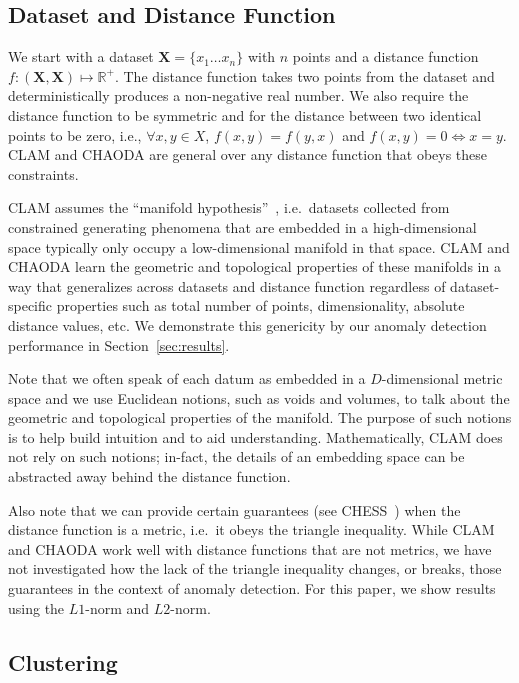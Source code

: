 \subsection{Dataset and Distance Function}
\label{subsec:methods:dataset-and-distance-function}

We start with a dataset $\textbf{X} = \{x_1 \dots x_n\}$ with $n$ points and a distance function $f : (\textbf{X}, \textbf{X}) \mapsto \mathbb{R}^+$.
The distance function takes two points from the dataset and deterministically produces a non-negative real number.
We also require the distance function to be symmetric and for the distance between two identical points to be zero, i.e., $\forall x, y \in X$, $f(x, y) = f(y, x)$ and $f(x, y) = 0 \Leftrightarrow x = y$.
CLAM and CHAODA are general over any distance function that obeys these constraints.

CLAM assumes the ``manifold hypothesis''~\cite{fefferman2016testing}, i.e.\ datasets collected from constrained generating phenomena that are embedded in a high-dimensional space typically only occupy a low-dimensional manifold in that space.
CLAM and CHAODA learn the geometric and topological properties of these manifolds in a way that generalizes across datasets and distance function regardless of dataset-specific properties such as total number of points, dimensionality, absolute distance values, etc.
We demonstrate this genericity by our anomaly detection performance in Section~\ref{sec:results}.

Note that we often speak of each datum as embedded in a $D$-dimensional metric space and we use Euclidean notions, such as voids and volumes, to talk about the geometric and topological properties of the manifold.
The purpose of such notions is to help build intuition and to aid understanding.
Mathematically, CLAM does not rely on such notions; in-fact, the details of an embedding space can be abstracted away behind the distance function.

Also note that we can provide certain guarantees (see CHESS~\cite{ishaq2019clustered}) when the distance function is a metric, i.e.\ it obeys the triangle inequality.
While CLAM and CHAODA work well with distance functions that are not metrics, we have not investigated how the lack of the triangle inequality changes, or breaks, those guarantees in the context of anomaly detection.
For this paper, we show results using the $L1$-norm and $L2$-norm.


\subsection{Clustering}
\label{subsec:methods:clustering}

